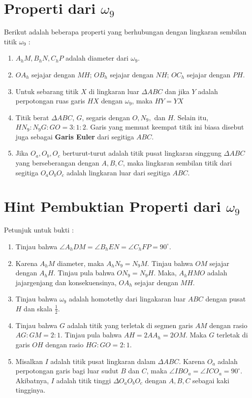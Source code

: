 \documentclass[11pt]{scrartcl}
\begin{document}
\section{Properti dari $\omega_9$}
Berikut adalah beberapa properti yang berhubungan dengan lingkaran sembilan titik $\omega_9$ :
\begin{enumerate}
    \item $A_hM, B_hN, C_hP$ adalah diameter dari $\omega_9$.
    \item $OA_h$ sejajar dengan $MH$; $OB_h$ sejajar dengan $NH$; $OC_h$ sejajar dengan $PH$.
    \item Untuk sebarang titik $X$ di lingkaran luar $\Delta ABC$ dan jika $Y$ adalah perpotongan ruas garis $HX$ dengan $\omega_9$, maka $HY = YX$
    \item Titik berat $\Delta ABC$, $G$, segaris dengan $O, N_9, $ dan $H$. Selain itu, $HN_9:N_9G:GO = 3:1:2$. Garis yang memuat keempat titik ini biasa disebut juga sebagai \textbf{Garis Euler} dari segitiga $ABC$.
    \item Jika $O_a,O_b,O_c$ berturut-turut adalah titik pusat lingkaran singgung $\Delta ABC$ yang berseberangan dengan $A,B,C$, maka lingkaran sembilan titik dari segitiga $O_aO_bO_c$ adalah lingkaran luar dari segitiga $ABC$.
\end{enumerate}
\newpage
\section{Hint Pembuktian Properti dari $\omega_9$}
Petunjuk untuk bukti : \begin{enumerate}
    \item Tinjau bahwa $\angle{A_hDM} = \angle{B_hEN} = \angle{C_hFP} = 90^\circ$.
    \item Karena $A_hM$ diameter, maka $A_hN_9 = N_9M$. Tinjau bahwa $OM$ sejajar dengan $A_hH$. Tinjau pula bahwa $ON_9 = N_9H$. Maka, $A_hHMO$ adalah jajargenjang dan konsekuensinya, $OA_h$ sejajar dengan $MH$.
    \item Tinjau bahwa $\omega_9$ adalah homotethy dari lingakaran luar $ABC$ dengan pusat $H$ dan skala $\frac{1}{2}$.
    \item Tinjau bahwa $G$ adalah titik yang terletak di segmen garis $AM$ dengan rasio $AG:GM = 2:1$. Tinjau pula bahwa $AH = 2AA_h = 2OM$. Maka $G$ terletak di garis $OH$ dengan rasio $HG:GO = 2:1$.
    \item Misalkan $I$ adalah titik pusat lingkaran dalam $\Delta ABC$. Karena $O_a$ adalah perpotongan garis bagi luar sudut $B$ dan $C$, maka $\angle{IBO_a} = \angle{ICO_a} = 90^\circ$. Akibatnya, $I$ adalah titik tinggi $\Delta O_aO_bO_c$ dengan $A,B,C$ sebagai kaki tingginya.
\end{enumerate}
\end{document}
